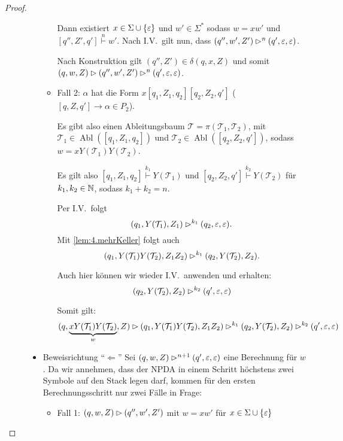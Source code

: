 \begin{proof}
\begin{description}
\begin{itemize}
\begin{itemize}
	  Dann existiert $x \in \Sigma \cup \{\varepsilon\}$ und $w'\in\Sigma^*$ sodass $w = xw'$ und $[q'', Z', q']\stackrel{n}{\vdash} w'$.
	  Nach I.V.\ gilt nun, dass $(q'', w', Z') \rhd^n (q',\varepsilon,\varepsilon)$.
	  
	  Nach Konstruktion gilt $(q'', Z')\in\delta(q, x, Z)$ und somit
	  $(q, w, Z) \rhd (q'', w', Z') \rhd^n (q',\varepsilon,\varepsilon)$.
      \item Fall 2: $\alpha$ hat die Form $x[q_1,Z_1,q_2][q_2, Z_2, q']$ ($[q,Z,q']\rightarrow\alpha \in P_2$).
      
      Es gibt also einen Ableitungsbaum $\mathcal{T} = \pi(\mathcal{T}_1,\mathcal{T}_2)$, mit $\mathcal{T}_1 \in \operatorname{Abl}([q_1, Z_1, q_2])$ und $\mathcal{T}_2 \in \operatorname{Abl}([q_2, Z_2, q'])$, sodass $w = xY(\mathcal{T}_1)Y(\mathcal{T}_2)$.
      
      Es gilt also $[q_1, Z_1, q_2]\stackrel{k_1}{\vdash} Y(\mathcal{T}_1)$ und 
      $[q_2, Z_2, q']\stackrel{k_2}{\vdash} Y(\mathcal{T}_2)$ für $k_1,k_2\in\mathbb{N}$, sodass $k_1+k_2=n$.
      
          Per I.V.\ folgt
          \begin{displaymath}
            (q_1, Y(\mathcal{T}_1), Z_1) \rhd^{k_1} (q_2, \varepsilon, \varepsilon).
          \end{displaymath}
          Mit \autoref{lem:4.mehrKeller} folgt auch
          \begin{displaymath}
            (q_1, Y(\mathcal{T}_1)Y(\mathcal{T}_2), Z_1Z_2) \rhd^{k_1} (q_2, Y(\mathcal{T}_2), Z_2).
          \end{displaymath}
          

      Auch hier können wir wieder I.V.\ anwenden und erhalten:
          \begin{displaymath}
            (q_2, Y(\mathcal{T}_2), Z_2) \rhd^{k_2} (q', \varepsilon, \varepsilon)
          \end{displaymath}
          
                    Somit gilt:
          \begin{displaymath}
            (q, \underbrace{xY(\mathcal{T}_1)Y(\mathcal{T}_2)}_{w}, Z) \rhd (q_1, Y(\mathcal{T}_1)Y(\mathcal{T}_2), Z_1Z_2) \rhd^{k_1} (q_2, Y(\mathcal{T}_2), Z_2) \rhd^{k_2} (q', \varepsilon, \varepsilon)
          \end{displaymath}
      \end{itemize}
      
      \item Beweisrichtung "`$\Leftarrow$"'
      Sei $(q,w,Z) \rhd^{n+1} (q',\varepsilon,\varepsilon)$ eine Berechnung für $w$. Da wir annehmen, 
      dass der \ac{NPDA} in einem Schritt höchstens zwei Symbole auf den Stack legen darf, kommen für den ersten Berechnungsschritt nur zwei Fälle in Frage:
      \begin{itemize}
      \item Fall 1: $(q,w,Z)\rhd (q'', w',Z')$ mit $w=xw'$ für $x\in\Sigma\cup\{\varepsilon\}$
      

\end{itemize}
\end{itemize}
\end{description}
\end{proof}
